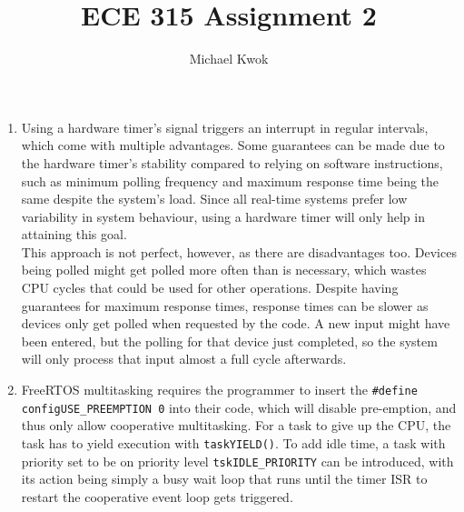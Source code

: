 \documentclass{article}
\title{ECE 315 Assignment 2}
\author{Michael Kwok}
\begin{document}
\maketitle
\begin{enumerate}
      \item Using a hardware timer's signal triggers an interrupt in regular intervals, which come with multiple advantages. Some guarantees can be made due to the hardware timer's stability compared to relying on software instructions, such as minimum polling frequency and maximum response time being the same despite the system's load. Since all real-time systems prefer low variability in system behaviour, using a hardware timer will only help in attaining this goal.\\
            This approach is not perfect, however, as there are disadvantages too. Devices being polled might get polled more often than is necessary, which wastes CPU cycles that could be used for other operations. Despite having guarantees for maximum response times, response times can be slower as devices only get polled when requested by the code. A new input might have been entered, but the polling for that device just completed, so the system will only process that input almost a full cycle afterwards.

      \item FreeRTOS multitasking requires the programmer to insert the \texttt{\#define configUSE\_PREEMPTION 0} into their code, which will disable pre-emption, and thus only allow cooperative multitasking. For a task to give up the CPU, the task has to yield execution with \verb|taskYIELD()|. To add idle time, a task with priority set to be on priority level \verb|tskIDLE_PRIORITY| can be introduced, with its action being simply a busy wait loop that runs until the timer ISR to restart the cooperative event loop gets triggered.


\end{enumerate}
\end{document}
